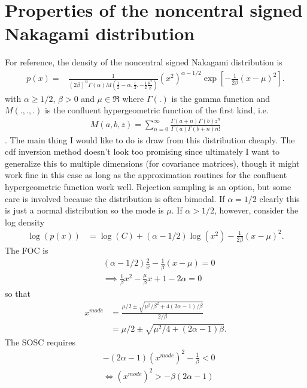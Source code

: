 \documentclass{article}\usepackage[]{graphicx}\usepackage[]{color}
\begin{document}
\section{Properties of the noncentral signed Nakagami distribution}
For reference, the density of the noncentral signed Nakagami distribution is
\begin{align}\label{dens1}
  p(x)  =& \frac{1}{(2\beta)^{\alpha}\Gamma\left(\alpha\right)M\left(\frac{1}{2}-\alpha,\frac{1}{2},-\frac{1}{2}\frac{\mu^2}{\beta}\right)}(x^2)^{\alpha - 1/2}\exp\left[-\frac{1}{2\beta}(x-\mu)^2\right].
\end{align}
with $\alpha\geq 1/2$, $\beta>0$ and $\mu\in\Re$ where $\Gamma(.)$ is the gamma function and $M(.,.,.)$ is the confluent hypergeometric function of the first kind, i.e.
\begin{align*}
M(a,b,z)=\sum_{n=0}^\infty\frac{\Gamma(a + n)\Gamma(b)z^n}{\Gamma(a)\Gamma(b+n)n!}  
\end{align*}. 
The main thing I would like to do is draw from this distribution cheaply. The cdf inversion method doesn't look too promising since ultimately I want to generalize this to multiple dimensions (for covariance matrices), though it might work fine in this case as long as the approximation routines for the confluent hypergeometric function work well. Rejection sampling is an option, but some care is involved because the distribution is often bimodal. If $\alpha=1/2$ clearly this is just a normal distribution so the mode is $\mu$. If $\alpha > 1/2$, however, consider the log density
\begin{align*}
\log(p(x)) & = \log(C) + (\alpha - 1/2)\log(x^2) - \frac{1}{2\beta}(x-\mu)^2.
\end{align*}
The FOC is
\begin{align*}
&  (\alpha - 1/2)\frac{2}{x} - \frac{1}{\beta}(x-\mu) = 0\\
&\implies \frac{1}{\beta}x^2 - \frac{\mu}{\beta}x + 1 - 2\alpha = 0
\end{align*}
so that
\begin{align*}
  x^{mode} & = \frac{\mu/2 \pm \sqrt{\mu^2/\beta^2 + 4(2\alpha - 1)/\beta}}{2/\beta}\\
    & = \mu/2 \pm \sqrt{\mu^2/4 + (2\alpha -1)\beta}.
\end{align*}
The SOSC requires 
\begin{align*}
  &-(2\alpha - 1)(x^{mode})^2- \frac{1}{\beta} < 0 \\
  &\iff (x^{mode})^2 > -\beta(2\alpha -1)
\end{align*}
\end{document}
